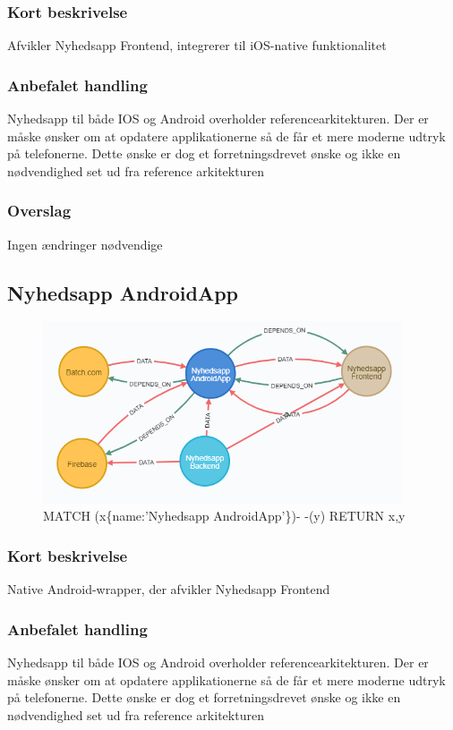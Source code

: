 \documentclass{article}
\begin{document}
\subsubsection{Kort beskrivelse}
Afvikler Nyhedsapp Frontend, integrerer til iOS-native funktionalitet
\subsubsection{Anbefalet handling}
Nyhedsapp til både IOS og Android overholder referencearkitekturen. Der er måske ønsker om at opdatere applikationerne så de får et mere moderne udtryk på telefonerne. Dette ønske er dog et forretningsdrevet ønske og ikke en nødvendighed set ud fra reference arkitekturen
\subsubsection{Overslag}
Ingen ændringer nødvendige

\subsection{Nyhedsapp AndroidApp}
\begin{figure}[h]
\includegraphics[width=300pt]{Nyhedsapp Android.PNG}
\caption{MATCH (x\{name:'Nyhedsapp AndroidApp'\})- -(y) RETURN x,y}
\end{figure}
\subsubsection{Kort beskrivelse}
Native Android-wrapper, der afvikler Nyhedsapp Frontend
\subsubsection{Anbefalet handling}
Nyhedsapp til både IOS og Android overholder referencearkitekturen. Der er måske ønsker om at opdatere applikationerne så de får et mere moderne udtryk på telefonerne. Dette ønske er dog et forretningsdrevet ønske og ikke en nødvendighed set ud fra reference arkitekturen
\end{document}
